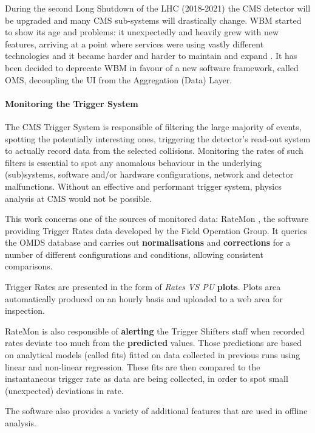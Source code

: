 During the second Long Shutdown of the LHC (2018-2021) the CMS detector will be upgraded and many CMS sub-systems will drastically change. WBM started to show its age and problems: it unexpectedly and heavily grew with new features, arriving at a point where services were using vastly different technologies and it became harder and harder to maintain and expand \cite{CMSWBMreview}. It has been decided to deprecate \cite{upgradewbmoms} WBM in favour of a new software framework, called OMS, decoupling the UI from the Aggregation (Data) Layer.

\paragraph{Monitoring the Trigger System}

The CMS Trigger System is responsible of filtering the large majority of events, spotting the potentially interesting ones, triggering the detector's read-out system to actually record data from the selected collisions. Monitoring the rates of such filters is essential to spot any anomalous behaviour in the underlying (sub)systems, software and/or hardware configurations, network and detector malfunctions. Without an effective and performant trigger system, physics analysis at CMS would not be possible.

This work concerns one of the sources of monitored data: RateMon \cite{Smith:2293136}, the software providing Trigger Rates data developed by the Field Operation Group. It queries the OMDS database and carries out \textbf{normalisations} and \textbf{corrections} for a number of different configurations and conditions, allowing consistent comparisons.

Trigger Rates are presented in the form of \textit{Rates VS PU} \textbf{plots}. Plots area automatically produced on an hourly basis and uploaded to a web area for inspection.

RateMon is also responsible of \textbf{alerting} the Trigger Shifters staff when recorded rates deviate too much from the \textbf{predicted} values. Those predictions are based on analytical models (called fits) fitted on data collected in previous runs using linear and non-linear regression. These fits are then compared to the instantaneous trigger rate as data are being collected, in order to spot small (unexpected) deviations in rate. 

The software also provides a variety of additional features that are used in offline analysis.

